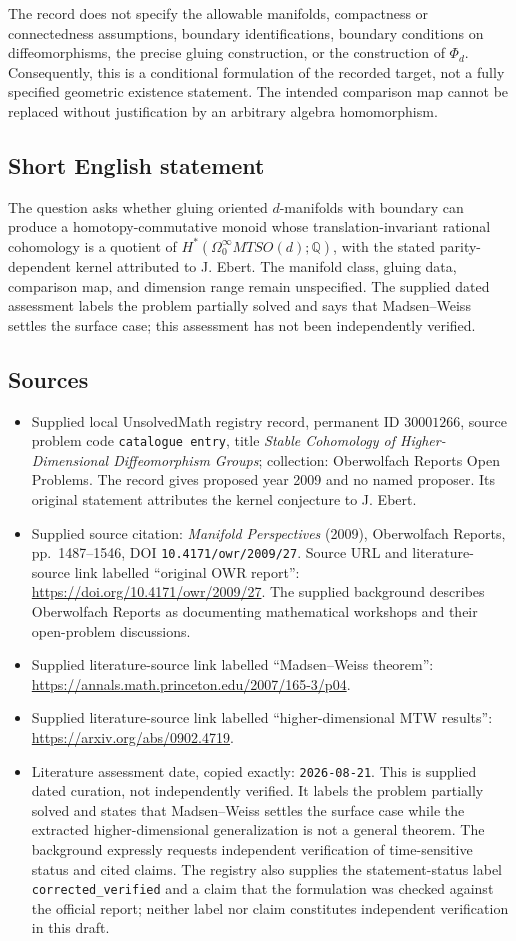 \documentclass[11pt]{article}
\newcommand{\Q}{\mathbb{Q}}
\begin{document}
The record does not specify the allowable manifolds, compactness or connectedness assumptions, boundary identifications, boundary conditions on diffeomorphisms, the precise gluing construction, or the construction of \(\Phi_d\). Consequently, this is a conditional formulation of the recorded target, not a fully specified geometric existence statement. The intended comparison map cannot be replaced without justification by an arbitrary algebra homomorphism.
\subsection{Short English statement}
The question asks whether gluing oriented \(d\)-manifolds with boundary can produce a homotopy-commutative monoid whose translation-invariant rational cohomology is a quotient of \(H^*(\Omega^\infty_0MTSO(d);\Q)\), with the stated parity-dependent kernel attributed to J. Ebert. The manifold class, gluing data, comparison map, and dimension range remain unspecified. The supplied dated assessment labels the problem partially solved and says that Madsen--Weiss settles the surface case; this assessment has not been independently verified.
\subsection{Sources}
\begin{itemize}
\item Supplied local UnsolvedMath registry record, permanent ID \(30001266\), source problem code \texttt{catalogue entry}, title \emph{Stable Cohomology of Higher-Dimensional Diffeomorphism Groups}; collection: Oberwolfach Reports Open Problems. The record gives proposed year 2009 and no named proposer. Its original statement attributes the kernel conjecture to J. Ebert.
\item Supplied source citation: \emph{Manifold Perspectives} (2009), Oberwolfach Reports, pp.\ 1487--1546, DOI \texttt{10.4171/owr/2009/27}. Source URL and literature-source link labelled ``original OWR report'': \url{https://doi.org/10.4171/owr/2009/27}. The supplied background describes Oberwolfach Reports as documenting mathematical workshops and their open-problem discussions.
\item Supplied literature-source link labelled ``Madsen--Weiss theorem'': \url{https://annals.math.princeton.edu/2007/165-3/p04}.
\item Supplied literature-source link labelled ``higher-dimensional MTW results'': \url{https://arxiv.org/abs/0902.4719}.
\item Literature assessment date, copied exactly: \texttt{2026-08-21}. This is supplied dated curation, not independently verified. It labels the problem partially solved and states that Madsen--Weiss settles the surface case while the extracted higher-dimensional generalization is not a general theorem. The background expressly requests independent verification of time-sensitive status and cited claims. The registry also supplies the statement-status label \texttt{corrected\_verified} and a claim that the formulation was checked against the official report; neither label nor claim constitutes independent verification in this draft.
\end{itemize}
\end{document}
